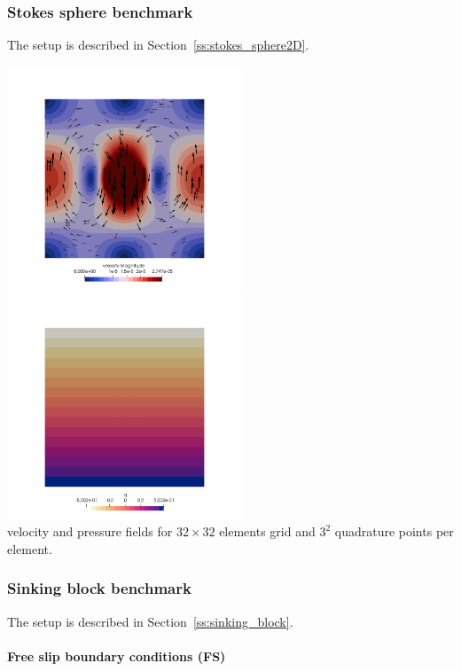 \subsubsection*{Stokes sphere benchmark}

The setup is described in Section~\ref{ss:stokes_sphere2D}.

\begin{center}
\includegraphics[width=7cm]{python_codes/fieldstone_18/results/sphere/vel}
\includegraphics[width=7cm]{python_codes/fieldstone_18/results/sphere/press}\\
{\captionfont velocity and pressure fields for $32\times 32$ elements grid and $3^2$
quadrature points per element.}
\end{center}

\subsubsection*{Sinking block benchmark}

The setup is described in Section~\ref{ss:sinking_block}.

\paragraph{Free slip boundary conditions (FS)}

